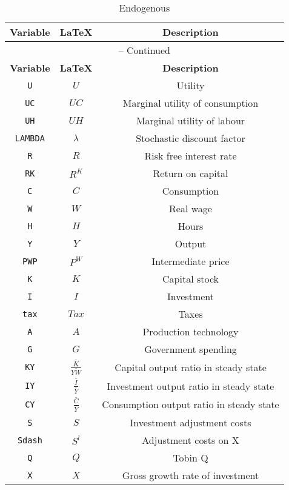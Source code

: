 \begin{center}
\begin{longtable}{ccc}
\caption{Endogenous}\\%
\hline%
\multicolumn{1}{c}{\textbf{Variable}} &
\multicolumn{1}{c}{\textbf{\LaTeX}} &
\multicolumn{1}{c}{\textbf{Description}}\\%
\hline\hline%
\endfirsthead
\multicolumn{3}{c}{{\tablename} \thetable{} -- Continued}\\%
\hline%
\multicolumn{1}{c}{\textbf{Variable}} &
\multicolumn{1}{c}{\textbf{\LaTeX}} &
\multicolumn{1}{c}{\textbf{Description}}\\%
\hline\hline%
\endhead
\texttt{U} & $U$ & Utility\\
\texttt{UC} & $UC$ & Marginal utility of consumption\\
\texttt{UH} & $UH$ & Marginal utility of labour\\
\texttt{LAMBDA} & $\lambda$ & Stochastic discount factor\\
\texttt{R} & $R$ & Risk free interest rate\\
\texttt{RK} & $R^{K}$ & Return on capital\\
\texttt{C} & $C$ & Consumption\\
\texttt{W} & $W$ & Real wage\\
\texttt{H} & $H$ & Hours\\
\texttt{Y} & $Y$ & Output\\
\texttt{PWP} & $P^{W}$ & Intermediate price\\
\texttt{K} & $K$ & Capital stock\\
\texttt{I} & $I$ & Investment\\
\texttt{tax} & $Tax$ & Taxes\\
\texttt{A} & $A$ & Production technology\\
\texttt{G} & $G$ & Government spending\\
\texttt{KY} & $\frac{\bar{K}}{\bar{YW}}$ & Capital output ratio in steady state\\
\texttt{IY} & $\frac{\bar{I}}{\bar{Y}}$ & Investment output ratio in steady state\\
\texttt{CY} & $\frac{\bar{C}}{\bar{Y}}$ & Consumption output ratio in steady state\\
\texttt{S} & $S$ & Investment adjustment costs\\
\texttt{Sdash} & $S^{l}$ & Adjustment costs on X\\
\texttt{Q} & $Q$ & Tobin Q\\
\texttt{X} & $X$ & Gross growth rate of investment\\

\end{longtable}
\end{center}
